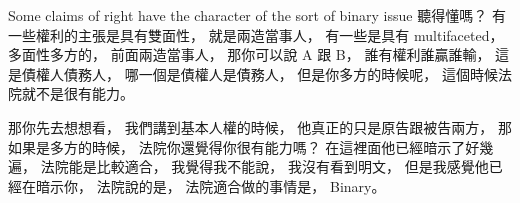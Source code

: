 \hypertarget{w06:cue:2259}{}Some claims of right have the character of the sort of binary issue
\hypertarget{w06:cue:2260}{}聽得懂嗎？
\hypertarget{w06:cue:2261}{}有一些權利的主張是具有雙面性，
\hypertarget{w06:cue:2262}{}就是兩造當事人，
\hypertarget{w06:cue:2263}{}有一些是具有 multifaceted，
\hypertarget{w06:cue:2264}{}多面性多方的，
\hypertarget{w06:cue:2265}{}前面兩造當事人，
\hypertarget{w06:cue:2266}{}那你可以說 A 跟 B，
\hypertarget{w06:cue:2267}{}誰有權利誰贏誰輸，
\hypertarget{w06:cue:2268}{}這是債權人債務人，
\hypertarget{w06:cue:2269}{}哪一個是債權人是債務人，
\hypertarget{w06:cue:2270}{}但是你多方的時候呢，
\hypertarget{w06:cue:2271}{}這個時候法院就不是很有能力。

\hypertarget{w06:cue:2272}{}那你先去想想看，
\hypertarget{w06:cue:2273}{}我們講到基本人權的時候，
\hypertarget{w06:cue:2274}{}他真正的只是原告跟被告兩方，
\hypertarget{w06:cue:2275}{}那如果是多方的時候，
\hypertarget{w06:cue:2276}{}法院你還覺得你很有能力嗎？
\hypertarget{w06:cue:2277}{}在這裡面他已經暗示了好幾遍，
\hypertarget{w06:cue:2278}{}法院能是比較適合，
\hypertarget{w06:cue:2279}{}我覺得我不能說，
\hypertarget{w06:cue:2280}{}我沒有看到明文，
\hypertarget{w06:cue:2281}{}但是我感覺他已經在暗示你，
\hypertarget{w06:cue:2282}{}法院說的是，
\hypertarget{w06:cue:2283}{}法院適合做的事情是，
\hypertarget{w06:cue:2284}{}Binary。

